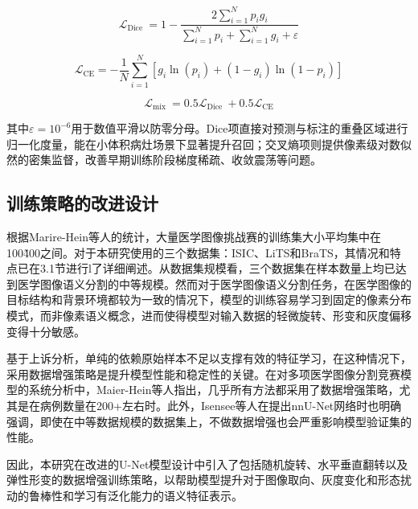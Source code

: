 \begin{equation}
    \mathcal{L}_{\text {Dice }}=1-\frac{2 \sum_{i=1}^{N} p_{i} g_{i}}{\sum_{i=1}^{N} p_{i}+\sum_{i=1}^{N} g_{i}+\varepsilon}
\end{equation}

\begin{equation}
    \mathcal{L}_{\mathrm{CE}}=-\frac{1}{N} \sum_{i=1}^{N}\left[g_{i} \ln \left(p_{i}\right)+\left(1-g_{i}\right) \ln \left(1-p_{i}\right)\right]
\end{equation}

\begin{equation}
    \mathcal{L}_{\text {mix }}=0.5 \mathcal{L}_{\text {Dice }}+0.5 \mathcal{L}_{\mathrm{CE}}
\end{equation}

其中$ \varepsilon=10^{-6} $用于数值平滑以防零分母。Dice项直接对预测与标注的重叠区域进行归一化度量，能在小体积病灶场景下显著提升召回；交叉熵项则提供像素级对数似然的密集监督，改善早期训练阶段梯度稀疏、收敛震荡等问题。

\subsection{训练策略的改进设计}

根据Marire-Hein等人\cite{maier-hein2018a}的统计，大量医学图像挑战赛的训练集大小平均集中在100\~400之间。对于本研究使用的三个数据集：ISIC、LiTS和BraTS，其情况和特点已在3.1节进行l了详细阐述。从数据集规模看，三个数据集在样本数量上均已达到医学图像语义分割的中等规模。然而对于医学图像语义分割任务，在医学图像的目标结构和背景环境都较为一致的情况下，模型的训练容易学习到固定的像素分布模式，而非像素语义概念，进而使得模型对输入数据的轻微旋转、形变和灰度偏移变得十分敏感。

基于上诉分析，单纯的依赖原始样本不足以支撑有效的特征学习，在这种情况下，采用数据增强策略是提升模型性能和稳定性的关键。在对多项医学图像分割竞赛模型的系统分析中，Maier-Hein等人\cite{maier-hein2018a}指出，几乎所有方法都采用了数据增强策略，尤其是在病例数量在200+左右时。此外，Isensee等人在提出nnU-Net网络时也明确强调\cite{isensee2021}，即使在中等数据规模的数据集上，不做数据增强也会严重影响模型验证集的性能。

因此，本研究在改进的U-Net模型设计中引入了包括随机旋转、水平垂直翻转以及弹性形变的数据增强训练策略，以帮助模型提升对于图像取向、灰度变化和形态扰动的鲁棒性和学习有泛化能力的语义特征表示。